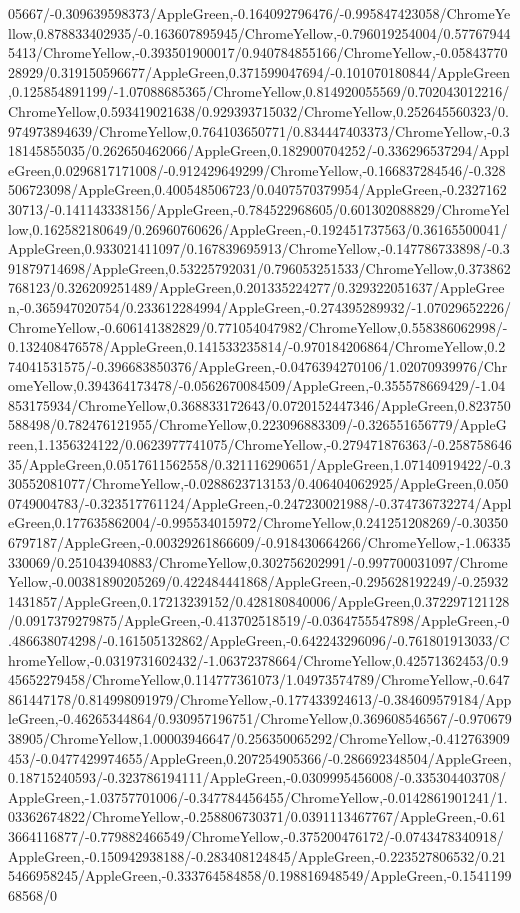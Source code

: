 {\begin{tikzternal}
05667/-0.309639598373/AppleGreen,-0.164092796476/-0.995847423058/ChromeYellow,0.878833402935/-0.163607895945/ChromeYellow,-0.796019254004/0.577679445413/ChromeYellow,-0.393501900017/0.940784855166/ChromeYellow,-0.0584377028929/0.319150596677/AppleGreen,0.371599047694/-0.101070180844/AppleGreen,0.125854891199/-1.07088685365/ChromeYellow,0.814920055569/0.702043012216/ChromeYellow,0.593419021638/0.929393715032/ChromeYellow,0.252645560323/0.974973894639/ChromeYellow,0.764103650771/0.834447403373/ChromeYellow,-0.318145855035/0.262650462066/AppleGreen,0.182900704252/-0.336296537294/AppleGreen,0.0296817171008/-0.912429649299/ChromeYellow,-0.166837284546/-0.328506723098/AppleGreen,0.400548506723/0.0407570379954/AppleGreen,-0.232716230713/-0.141143338156/AppleGreen,-0.784522968605/0.601302088829/ChromeYellow,0.162582180649/0.26960760626/AppleGreen,-0.192451737563/0.36165500041/AppleGreen,0.933021411097/0.167839695913/ChromeYellow,-0.147786733898/-0.391879714698/AppleGreen,0.53225792031/0.796053251533/ChromeYellow,0.373862768123/0.326209251489/AppleGreen,0.201335224277/0.329322051637/AppleGreen,-0.365947020754/0.233612284994/AppleGreen,-0.274395289932/-1.07029652226/ChromeYellow,-0.606141382829/0.771054047982/ChromeYellow,0.558386062998/-0.132408476578/AppleGreen,0.141533235814/-0.970184206864/ChromeYellow,0.274041531575/-0.396683850376/AppleGreen,-0.0476394270106/1.02070939976/ChromeYellow,0.394364173478/-0.0562670084509/AppleGreen,-0.355578669429/-1.04853175934/ChromeYellow,0.368833172643/0.0720152447346/AppleGreen,0.823750588498/0.782476121955/ChromeYellow,0.223096883309/-0.326551656779/AppleGreen,1.1356324122/0.0623977741075/ChromeYellow,-0.279471876363/-0.25875864635/AppleGreen,0.0517611562558/0.321116290651/AppleGreen,1.07140919422/-0.330552081077/ChromeYellow,-0.0288623713153/0.406404062925/AppleGreen,0.0500749004783/-0.323517761124/AppleGreen,-0.247230021988/-0.374736732274/AppleGreen,0.177635862004/-0.995534015972/ChromeYellow,0.241251208269/-0.303506797187/AppleGreen,-0.00329261866609/-0.918430664266/ChromeYellow,-1.06335330069/0.251043940883/ChromeYellow,0.302756202991/-0.997700031097/ChromeYellow,-0.00381890205269/0.422484441868/AppleGreen,-0.295628192249/-0.259321431857/AppleGreen,0.17213239152/0.428180840006/AppleGreen,0.372297121128/0.0917379279875/AppleGreen,-0.413702518519/-0.0364755547898/AppleGreen,-0.486638074298/-0.161505132862/AppleGreen,-0.642243296096/-0.761801913033/ChromeYellow,-0.0319731602432/-1.06372378664/ChromeYellow,0.42571362453/0.945652279458/ChromeYellow,0.114777361073/1.04973574789/ChromeYellow,-0.647861447178/0.814998091979/ChromeYellow,-0.177433924613/-0.384609579184/AppleGreen,-0.46265344864/0.930957196751/ChromeYellow,0.369608546567/-0.97067938905/ChromeYellow,1.00003946647/0.256350065292/ChromeYellow,-0.412763909453/-0.0477429974655/AppleGreen,0.207254905366/-0.286692348504/AppleGreen,0.18715240593/-0.323786194111/AppleGreen,-0.0309995456008/-0.335304403708/AppleGreen,-1.03757701006/-0.347784456455/ChromeYellow,-0.0142861901241/1.03362674822/ChromeYellow,-0.258806730371/0.0391113467767/AppleGreen,-0.613664116877/-0.779882466549/ChromeYellow,-0.375200476172/-0.0743478340918/AppleGreen,-0.150942938188/-0.283408124845/AppleGreen,-0.223527806532/0.215466958245/AppleGreen,-0.333764584858/0.198816948549/AppleGreen,-0.154119968568/0
\end{tikzternal}}
